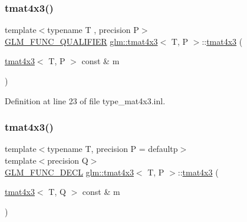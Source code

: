 \subsubsection{\texorpdfstring{tmat4x3()}{tmat4x3()}\hspace{0.1cm}{\footnotesize\ttfamily [2/22]}}
{\footnotesize\ttfamily template$<$typename T , precision P$>$ \\
\mbox{\hyperlink{setup_8hpp_a33fdea6f91c5f834105f7415e2a64407}{G\+L\+M\+\_\+\+F\+U\+N\+C\+\_\+\+Q\+U\+A\+L\+I\+F\+I\+ER}} \mbox{\hyperlink{structglm_1_1tmat4x3}{glm\+::tmat4x3}}$<$ T, P $>$\+::\mbox{\hyperlink{structglm_1_1tmat4x3}{tmat4x3}} (\begin{DoxyParamCaption}\item[{\mbox{\hyperlink{structglm_1_1tmat4x3}{tmat4x3}}$<$ T, P $>$ const \&}]{m }\end{DoxyParamCaption})}



Definition at line 23 of file type\+\_\+mat4x3.\+inl.

\mbox{\label{structglm_1_1tmat4x3_a1dadd893a6f4303c828c1703c01b6a82}} 
\subsubsection{\texorpdfstring{tmat4x3()}{tmat4x3()}\hspace{0.1cm}{\footnotesize\ttfamily [3/22]}}
{\footnotesize\ttfamily template$<$typename T, precision P = defaultp$>$ \\
template$<$precision Q$>$ \\
\mbox{\hyperlink{setup_8hpp_ab2d052de21a70539923e9bcbf6e83a51}{G\+L\+M\+\_\+\+F\+U\+N\+C\+\_\+\+D\+E\+CL}} \mbox{\hyperlink{structglm_1_1tmat4x3}{glm\+::tmat4x3}}$<$ T, P $>$\+::\mbox{\hyperlink{structglm_1_1tmat4x3}{tmat4x3}} (\begin{DoxyParamCaption}\item[{\mbox{\hyperlink{structglm_1_1tmat4x3}{tmat4x3}}$<$ T, Q $>$ const \&}]{m }\end{DoxyParamCaption})}

\mbox{\label{structglm_1_1tmat4x3_a8311c825e665728b311c89b517672965}} 
